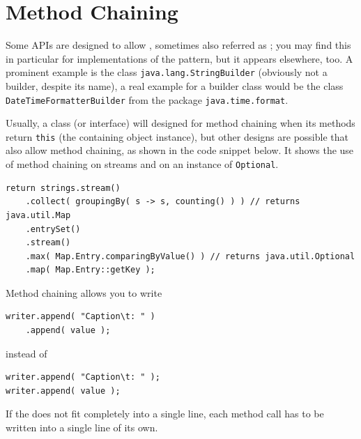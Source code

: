 \section{Method Chaining}
Some APIs are designed to allow , sometimes also referred as ; you may find this in particular for implementations of the  pattern, but it appears elsewhere, too. A prominent example is the class \lstinline|java.lang.StringBuilder| \autocite{ORACLE_DOC_STRINGBUILDER_CLASS} (obviously not a builder, despite its name), a real example for a builder class would be the class \lstinline|DateTimeFormatterBuilder| \autocite{ORACLE_DOC_DATETIMEFORMATTERBUILDER_CLASS} from the package \lstinline|java.time.format|.

Usually, a class (or interface) will designed for method chaining when its methods return \lstinline|this| (the containing object instance), but other designs are possible that also allow method chaining, as shown in the code snippet below. It shows the use of method chaining on streams and on an instance of \lstinline|Optional|.

\begin{lstlisting}
return strings.stream()
    .collect( groupingBy( s -> s, counting() ) ) // returns java.util.Map
    .entrySet() 
    .stream()
    .max( Map.Entry.comparingByValue() ) // returns java.util.Optional
    .map( Map.Entry::getKey );
\end{lstlisting}

Method chaining allows you to write
\begin{lstlisting}
writer.append( "Caption\t: " )
    .append( value );
\end{lstlisting}

instead of
\begin{lstlisting}
writer.append( "Caption\t: " );
writer.append( value );
\end{lstlisting}

If the  does not fit completely into a single line, each method call has to be written into a single line of its own.

